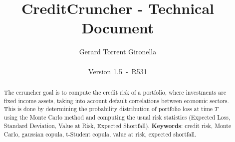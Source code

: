 \documentclass[a4paper,12pt,final]{article}
\def\numversion{1.5}
\def\svnversion{R531}
\begin{document}
\title{CreditCruncher - Technical Document}
\author{Gerard Torrent Gironella\\\\Version \numversion\ -\ \svnversion}
\date{}
\maketitle


\begin{abstract}
The ccruncher goal is to compute the credit risk of a portfolio, where 
investments are fixed income assets, taking into account default correlations
between economic sectors. This is done by determining the probability distribution 
of portfolio loss at time $T$ using the Monte Carlo method and computing the
usual risk statistics (Expected Loss, Standard Deviation, Value at Risk, Expected 
Shortfall).
\newline
\newline
\textbf{Keywords}: credit risk, Monte Carlo, gaussian copula, t-Student copula,
value at risk, expected shortfall.
\end{abstract}
\newpage


\tableofcontents
\newpage
\end{document}
